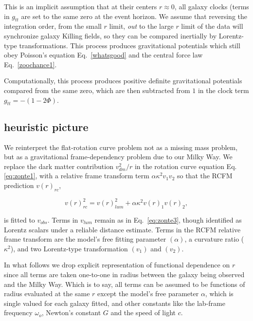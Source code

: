 \documentclass[reprint,%
 amsmath,amssymb,
 aps,
]{revtex4-1}
\begin{document}
  This is an implicit assumption that at their centers $r\approx 0$, all galaxy clocks (terms in $g_{tt}$ are set to the same zero at the event horizon.  We assume that reversing  the   integration order,   from the small $r$ limit, 
   \emph{out} to the large $r$ limit of the data   will synchronize   galaxy Killing fields, 
   so they can be compared inertially by Lorentz-type transformations. 
This process produces gravitational 
potentials  which  still   obey Poisson's equation Eq.~\ref{whatsgood} and the central force law Eq.~\ref{zoochance1}. 

Computationally, 
      this process produces positive definite gravitational potentials compared from the same zero, which are then   subtracted from $1$ in  the clock term $g_{tt}=-(1-2\Phi)$.  



\subsection{heuristic picture}
We reinterpret the flat-rotation curve problem not as a missing mass problem, but as a gravitational frame-dependency problem due to our Milky Way.  
We   replace 
  the dark matter contribution $v^2_{dm}/r$ in the rotation curve equation  Eq.\ref{eq:zonte1},  with a
  relative frame transform term $\alpha \kappa^2 v_1 v_2$ so that the RCFM  prediction  $v(r)_{rc}$,  

\begin{equation}
v(r)_{rc}^2 =  v(r)_{lum}^2+\alpha \kappa^2 v(r)_{1} v(r)_{2},  
\label{eq:zonteLCM}
\end{equation}  
 
    is fitted to $v_{obs}$.
Terms in $v_{lum}$ remain   as in 
  Eq.~\ref{eq:zonte3}, though identified as Lorentz scalars under a reliable distance estimate. Terms in the RCFM relative frame transform are the  model's free fitting parameter $(\alpha)$, a curvature ratio ($\kappa^2$),  and two Lorentz-type transformation $(v_1)$ and $(v_2)$. 
  

 
 
   
 
  In what follows we   drop explicit representation of functional dependence on $r$ since all terms are taken one-to-one in radius between the galaxy being observed and the Milky Way. Which is to say,  all   terms  can be assumed to  be functions of radius evaluated at the same $r$  except the model's free parameter $\alpha$,  which is single valued for each galaxy fitted, and other constants like the lab-frame frequency $\omega_o$, Newton's constant $G$ and the speed of light $c$.  
  
\end{document}

